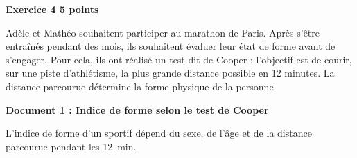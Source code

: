 \textbf{Exercice 4 \hfill 5 points}

\medskip

Adèle et Mathéo souhaitent participer au marathon de Paris. Après s'être entraînés
pendant des mois, ils souhaitent évaluer leur état de forme avant de s'engager. Pour
cela, ils ont réalisé un test dit \og de Cooper\fg{} : l'objectif est de courir, sur une piste
d'athlétisme, la plus grande distance possible en 12 minutes. La distance parcourue
détermine la forme physique de la personne.

\medskip

\textbf{Document 1 : Indice de forme selon le test de Cooper}

\medskip

L'indice de forme d'un sportif dépend du sexe, de l'âge et de la distance parcourue
pendant les 12~min.

